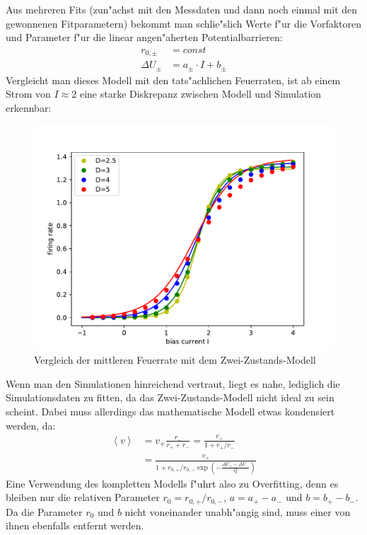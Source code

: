 \documentclass[12pt,a4paper]{article}
\begin{document}
Aus mehreren Fits (zun"achst mit den Messdaten und dann noch einmal mit den gewonnenen Fitparametern) bekommt man schlie"slich Werte f"ur die Vorfaktoren und Parameter f"ur die linear angen"aherten Potentialbarrieren:
\begin{align*}
r_{0,\pm}&=const\\
\Delta U_\pm&=a_\pm\cdot I+b_\pm
\end{align*}
Vergleicht man dieses Modell mit den tats"achlichen Feuerraten, ist ab einem Strom von $I\approx 2$ eine starke Diskrepanz zwischen Modell und Simulation erkennbar:
\begin{figure}[H]
	\centering
	\includegraphics[scale=0.9]{gcompdf29mvarv.pdf}
	\caption{Vergleich der mittleren Feuerrate mit dem Zwei-Zustands-Modell}
	\label{gcompvarv}
\end{figure}
Wenn man den Simulationen hinreichend vertraut, liegt es nahe, lediglich die Simulationsdaten zu fitten, da das Zwei-Zustands-Modell nicht ideal zu sein scheint. Dabei muss allerdings das mathematische Modell etwas kondensiert werden, da:
\begin{align*}
\left<v\right>&=v_+\frac{r_-}{r_++r_-}=\frac{v_+}{1+r_+/r_-}\\
&=\frac{v_+}{1+r_{0,+}/r_{0,-}\exp(-\frac{\Delta U_+-\Delta U_-}{Q})}
\end{align*}
Eine Verwendung des kompletten Modells f"uhrt also zu Overfitting, denn es bleiben nur die relativen Parameter $r_0=r_{0,+}/r_{0,-}$, $a=a_+-a_-$ und $b=b_+-b_-$. Da die Parameter $r_0$ und $b$ nicht voneinander unabh"angig sind, muss einer von ihnen ebenfalls entfernt werden.\\
\end{document}
